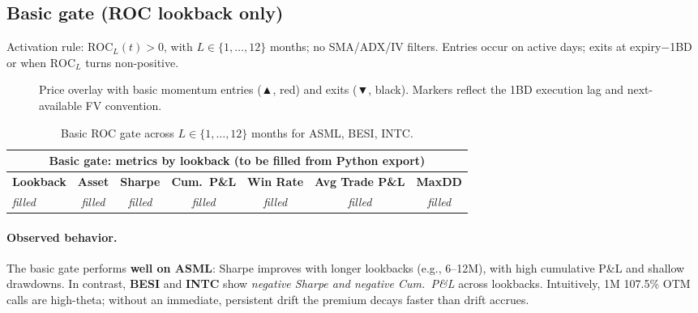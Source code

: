 \documentclass[12pt,a4paper]{report}
\begin{document}
\subsection{Basic gate (ROC lookback only)}
Activation rule: $\mathrm{ROC}_{L}(t) > 0$, with $L\in\{1,\dots,12\}$ months; no SMA/ADX/IV filters.
Entries occur on active days; exits at expiry$-$1BD or when $\mathrm{ROC}_{L}$ turns non-positive.

\begin{figure}[h]
\centering
\fbox{\rule{0pt}{2.1in}\rule{.95\linewidth}{0pt}}
\caption{Price overlay with basic momentum entries (▲, red) and exits (▼, black).
Markers reflect the 1BD execution lag and next-available FV convention.}
\label{fig:mombull_basic_overlay}
\end{figure}

\begin{table}[h]
\centering
\small
\begin{tabular}{lcccccc}
\toprule
\multicolumn{7}{c}{\textbf{Basic gate: metrics by lookback} (to be filled from Python export)}\\
\midrule
\textbf{Lookback} & \textbf{Asset} & \textbf{Sharpe} & \textbf{Cum.\ P\&L} & \textbf{Win Rate} & \textbf{Avg Trade P\&L} & \textbf{MaxDD} \\
\midrule
\emph{filled} & \emph{filled} & \emph{filled} & \emph{filled} & \emph{filled} & \emph{filled} & \emph{filled} \\
\bottomrule
\end{tabular}
\caption{Basic ROC gate across $L\in\{1,\dots,12\}$ months for ASML, BESI, INTC.}
\label{tab:mombull_basic_metrics}
\end{table}

\paragraph{Observed behavior.}
The basic gate performs \textbf{well on ASML}: Sharpe improves with longer lookbacks
(e.g., 6–12M), with high cumulative P\&L and shallow drawdowns. In contrast,
\textbf{BESI} and \textbf{INTC} show \emph{negative Sharpe and negative Cum.\ P\&L} across lookbacks.
Intuitively, 1M 107.5\% OTM calls are high-theta; without an immediate, persistent
drift the premium decays faster than drift accrues.
\end{document}
